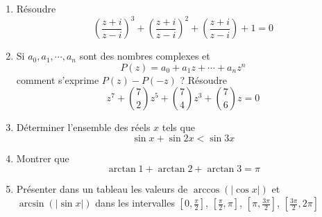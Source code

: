 \begin{enumerate}
\item  R{\'e}soudre
\[
\left( \frac{z+i}{z-i}\right) ^{3}+\left( \frac{z+i}{z-i}\right) ^{2}+\left(
\frac{z+i}{z-i}\right) +1=0
\]

\item  Si $a_{0},a_{1},\cdots ,a_{n}$ sont des nombres complexes et
\[
P(z)=a_{0}+a_{1}z+\cdots +a_{n}z^{n}
\]
comment s'exprime $P(z)-P(-z)$ ?\newline
R{\'e}soudre
\[
z^{7}+\binom{7}{2}z^{5}+\binom{7}{4}z^{3}+\binom{7}{6}z=0
\]

\item  D{\'e}terminer l'ensemble des r{\'e}els $x$ tels que
\[
\sin x+\sin 2x<\sin 3x
\]

\item  Montrer que
\[
\arctan 1+\arctan 2+\arctan 3=\pi
\]


\item  Pr{\'e}senter dans un tableau les valeurs de $\arccos (\left| \cos
x\right| )$ et $\arcsin (\left| \sin x\right| )$ dans les intervalles $%
\left[ 0,\frac{\pi }{2}\right] $, $\left[ \frac{\pi }{2},\pi \right] $, $%
\left[ \pi ,\frac{3\pi }{2}\right] $, $\left[ \frac{3\pi }{2},2\pi \right] $

\end{enumerate}

